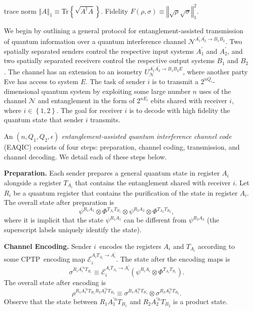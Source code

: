 \documentclass[aps,11pt,twoside,letterpaper]{article}
\begin{document}
		
		trace norm $\left\Vert A\right\Vert _{1}\equiv$Tr$\left\{  \sqrt{A^{\dag}%
		A}\right\}  $. Fidelity $F\left(  \rho,\sigma\right)  \equiv\left\Vert
		\sqrt{\rho}\sqrt{\sigma}\right\Vert _{1}^{2}$.


		    

		

		We begin by outlining a general protocol for entanglement-assisted
		transmission of quantum information over a quantum interference channel
		$\mathcal{N}^{A_{1}^{\prime}A_{2}^{\prime}\rightarrow B_{1}B_{2}}$. Two
		spatially separated senders control the respective input systems
		$A_{1}^{\prime}$ and $A_{2}^{\prime}$, and two spatially separated receivers
		control the respective output systems $B_{1}$ and $B_{2}$. The channel has an
		extension to an isometry $U_{\mathcal{N}}^{A_{1}^{\prime}A_{2}^{\prime
		}\rightarrow B_{1}B_{2}E}$, where another party Eve has access to system $E$.
		The task of sender $i$ is to transmit a $2^{nQ_{i}}$-dimensional quantum
		system by exploiting some large number $n$ uses of the channel $\mathcal{N}$
		and entanglement in the form of $2^{nE_{i}}$ ebits shared with receiver $i$,
		where $i\in\left\{  1,2\right\}  $. The goal for receiver $i$ is to decode
		with high fidelity the quantum state that sender $i$ transmits.

		An $(n,Q_{1},Q_{2},\epsilon)$ \textit{entanglement-assisted quantum
		interference channel code} (EAQIC) consists of four steps: preparation,
		channel coding, transmission, and channel decoding. We detail each of these
		steps below.

		\textbf{Preparation.} Each sender prepares a general quantum state in register
		$A_{i}$ alongside a register $T_{A_{i}}$ that contains the entanglement shared
		with receiver $i$. Let $R_{i}$ be a quantum register that contains the
		purification of the state in register $A_{i}$. The overall state after
		preparation is%
		\[
		\psi^{R_{1}A_{1}}\otimes\Phi^{T_{A_{1}}T_{B_{1}}}\otimes\psi^{R_{2}A_{2}%
		}\otimes\Phi^{T_{A_{2}}T_{B_{2}}},
		\]
		where it is implicit that the state $\psi^{R_{1}A_{1}}$ can be different from
		$\psi^{R_{2}A_{2}}$ (the superscript labels uniquely identify the state).

		\textbf{Channel Encoding.} Sender $i$\ encodes the registers $A_{i}$ and
		$T_{A_{i}}$ according to some CPTP\ encoding map $\mathcal{E}_{i}%
		^{A_{i}T_{A_{i}}\rightarrow A_{i}^{\prime}}$. The state after the encoding
		maps is%
		\[
		\sigma^{R_{i}A_{i}^{\prime n}T_{B_{i}}}\equiv\mathcal{E}_{i}^{A_{i}T_{A_{i}%
		}\rightarrow A_{i}^{\prime}}(\psi^{R_{i}A_{i}}\otimes\Phi^{T_{A_{i}}T_{B_{i}}%
		}).
		\]
		The overall state after encoding is%
		\[
		\rho^{R_{1}A_{1}^{\prime n}T_{B_{1}}R_{2}A_{2}^{\prime n}T_{B_{2}}}%
		\equiv\sigma^{R_{1}A_{1}^{\prime n}T_{B_{1}}}\otimes\sigma^{R_{2}A_{2}^{\prime
		n}T_{B_{2}}}.
		\]
		Observe that the state between $R_{1}A_{1}^{\prime n}T_{B_{1}}$ and
		$R_{2}A_{2}^{\prime n}T_{B_{2}}$ is a product state.
\end{document}
